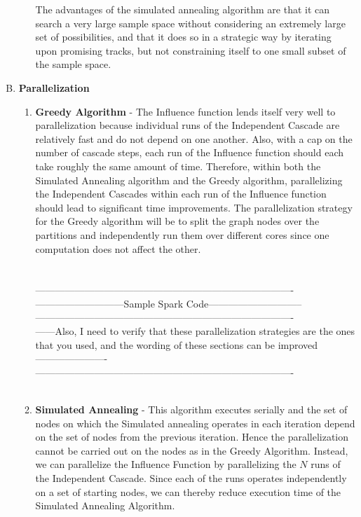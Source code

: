 \documentclass[11pt]{scrartcl} %
\begin{document}
\begin{enumerate}[A)]
\begin{enumerate}[i.]
The advantages of the simulated annealing algorithm are that it can search a very large sample space without considering an extremely large set of possibilities, and that it does so in a strategic way by iterating upon promising tracks, but not constraining itself to one small subset of the sample space.  \\
\end{enumerate}

\item \textbf {Parallelization}\\
\begin{enumerate}
\item \textbf{Greedy Algorithm} -
The Influence function lends itself very well to parallelization because individual runs of the Independent Cascade are relatively fast and do not depend on one another.  Also, with a cap on the number of cascade steps, each run of the Influence function should each take roughly the same amount of time.  Therefore, within both the Simulated Annealing algorithm and the Greedy algorithm, parallelizing the Independent Cascades within each run of the Influence function should lead to significant time improvements. The parallelization strategy for the Greedy algorithm will be to split the graph nodes over the partitions and independently run them over different cores since one computation does not affect the other.\\
\\
\\
-------------------------------------------------------------------------------\\
---------------------------Sample Spark Code-----------------------------\\
-------------------------------------------------------------------------------\\
------Also, I need to verify that these parallelization strategies are the ones that you used, and the wording of these sections can be improved----------------------\\
-------------------------------------------------------------------------------\\
\\
\item \textbf{Simulated Annealing} - 
This algorithm executes serially and the set of nodes on which the Simulated annealing operates in each iteration depend on the set of nodes from the previous iteration. Hence the parallelization cannot be carried out on the nodes as in the Greedy Algorithm. Instead, we can parallelize the Influence Function by parallelizing the $N$ runs of the Independent Cascade. Since each of the runs operates independently on a set of starting nodes, we can thereby reduce execution time of the Simulated Annealing Algorithm.  

\end{enumerate}
\end{enumerate}
\end{document}
